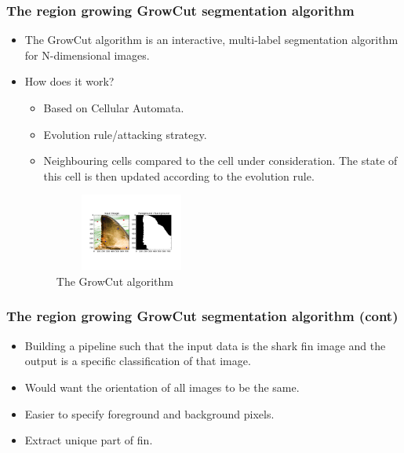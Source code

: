 \documentclass{beamer}
\newcommand{\myitem}{\item[$-$]}
\begin{document}
\begin{frame}
\frametitle{The region growing GrowCut segmentation algorithm}
\begin{itemize}
\item The GrowCut algorithm is an interactive, multi-label segmentation algorithm for N-dimensional images\cite{alg}.
\pause
\item How does it work? 
\begin{itemize}
\myitem Based on Cellular Automata\cite{cellularoutomata}.
\myitem Evolution rule/attacking strategy.
\myitem Neighbouring cells compared to the cell under consideration.  The state of this cell is then updated
according to the evolution rule.
\end{itemize}
\pause
\begin{figure}
\centering
\includegraphics[width=2in, height=1in]{demo1.png}
\caption{The GrowCut algorithm}
\end{figure}
\end{itemize}
\end{frame}

\begin{frame}
\frametitle{The region growing GrowCut segmentation algorithm (cont)}
\begin{itemize}
\item Building a pipeline such that the input data is the shark fin image and the output is a specific
classification of that image.
\item Would want the orientation of all images to be the same.
\item Easier to specify foreground and background pixels.
\item Extract unique part of fin.
\end{itemize}
\end{frame}
\end{document}
